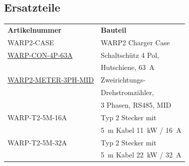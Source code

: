 \documentclass[a4paper,10pt]{article}
\begin{document}
\begin{multicols*}{2}
	\subsection{Ersatzteile}
	\begin{tabular}{ll}
		\textbf{Artikelnummer}                                                                                                   & \textbf{Bauteil}                                              \\
		\cmidrule(lr{0.5em}){1-2}		WARP2-CASE																				 & WARP2 Charger Case                                             \\
		\cmidrule(lr{0.5em}){1-2}
		\href{https://www.tinkerforge.com/de/shop/warp/contactor-4-pole-din-rail-63a.html}{WARP-CON-4P-63A}                      & Schaltschütz 4 Pol,                                           \\
		                                                                                                                         & Hutschiene, \SI{63}{\ampere}                                  \\
		\cmidrule(lr{0.5em}){1-2}
		\href{}{WARP2-METER-3PH-MID} & Zweirichtungs-                                                \\
		                                                                                                                         & Drehstromzähler,                                              \\
		                                                                                                                         & 3 Phasen, RS485, MID                                          \\
		\cmidrule(lr{0.5em}){1-2}
		WARP-T2-5M-16A                                                                                                           & Typ 2 Stecker mit                                             \\
		                                                                                                                         & \SI{5}{\meter} Kabel \SI{11}{\kilo\watt} / \SI{16}{\ampere}   \\
		\cmidrule(lr{0.5em}){1-2}
		WARP-T2-5M-32A                                                                                                           & Typ 2 Stecker mit                                             \\
		                                                                                                                         & \SI{5}{\meter} Kabel \SI{22}{\kilo\watt} / \SI{32}{\ampere}   \\

\end{tabular}
\end{multicols*}
\end{document}
